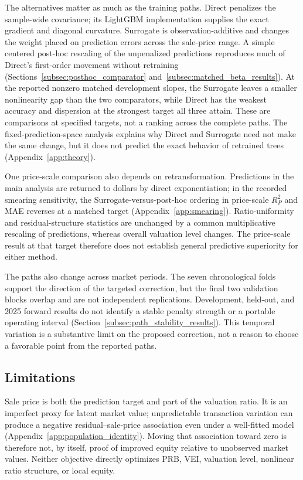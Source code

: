 \documentclass[10pt]{article}
\theoremstyle{definition}
\newcommand{\1}{\mathbf{1}}
\begin{document}
The alternatives matter as much as the training paths. Direct penalizes the
sample-wide covariance; its LightGBM implementation supplies the exact
gradient and diagonal curvature. Surrogate is observation-additive and changes
the weight placed on prediction errors across the sale-price range. A simple
centered post-hoc rescaling of the unpenalized predictions reproduces much of
Direct's first-order movement without retraining
(Sections~\ref{subsec:posthoc_comparator} and~\ref{subsec:matched_beta_results}).
At the reported nonzero matched development slopes, the Surrogate leaves a
smaller nonlinearity gap than the two comparators, while Direct has the weakest
accuracy and dispersion at the strongest target all three attain. These are
comparisons at specified targets, not a ranking across the complete paths.
The fixed-prediction-space analysis explains why Direct and Surrogate need not
make the same change, but it does not predict the exact behavior of retrained
trees (Appendix~\ref{app:theory}).

One price-scale comparison also depends on retransformation. Predictions in
the main analysis are returned to dollars by direct exponentiation; in the
recorded smearing sensitivity, the Surrogate-versus-post-hoc ordering in
price-scale $R^2_P$ and MAE reverses at a matched target
(Appendix~\ref{app:smearing}). Ratio-uniformity and residual-structure
statistics are unchanged by a common multiplicative rescaling of predictions,
whereas overall valuation level changes. The price-scale result at that target
therefore does not establish general predictive superiority for either method.

The paths also change across market periods. The seven chronological folds
support the direction of the targeted correction, but the final two validation
blocks overlap and are not independent replications. Development, held-out,
and 2025 forward results do not identify a stable penalty strength or a
portable operating interval (Section~\ref{subsec:path_stability_results}).
This temporal variation is a substantive limit on the proposed correction,
not a reason to choose a favorable point from the reported paths.

\subsection{Limitations}
\label{subsec:external_results_boundary}

Sale price is both the prediction target and part of the valuation ratio. It
is an imperfect proxy for latent market value; unpredictable transaction
variation can produce a negative residual--sale-price association even under
a well-fitted model (Appendix~\ref{app:population_identity}). Moving that
association toward zero is therefore not, by itself, proof of improved equity
relative to unobserved market values. Neither objective directly optimizes
PRB, VEI, valuation level, nonlinear ratio structure, or local equity.
\end{document}
